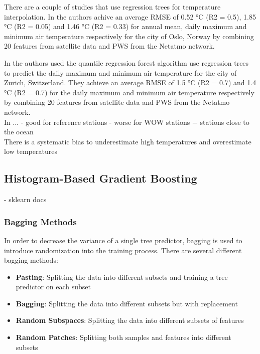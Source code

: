 There are a couple of studies that use regression trees for temperature interpolation. In \cite{venter2020hyperlocal} the authors achive an average RMSE of 0.52 °C (R2 = 0.5), 1.85 °C (R2 = 0.05) and 1.46 °C (R2 = 0.33) for annual mean, daily maximum and minimum air temperature respectively for the city of Oslo, Norway by combining 20 features from satellite data and PWS from the Netatmo network.

In \cite{zumwald2021mapping} the authors used the quantile regression forest algorithm
use regression trees to predict the daily maximum and minimum air temperature for the city of Zurich, Switzerland. They achieve an average RMSE of 1.5 °C (R2 = 0.7) and 1.4 °C (R2 = 0.7) for the daily maximum and minimum air temperature respectively by combining 20 features from satellite data and PWS from the Netatmo network.\\

In \cite{ho2014mapping}... %
- good for reference stations
- worse for WOW stations + stations close to the ocean\\

There is a systematic bias to underestimate high temperatures and overestimate low temperatures~\cite{zumwald2021mapping, zhang2012bias}

\subsection{Histogram-Based Gradient Boosting}



\cite{apaydin2022evaluation}
- sklearn docs

\subsubsection{Bagging Methods}

In order to decrease the variance of a single tree predictor, bagging is used to introduce randomization into the training process. There are several different bagging methods:

\begin{itemize}
    \item \textbf{Pasting}: Splitting the data into different subsets and training a tree predictor on each subset~\cite{breiman1999pasting}
    \item \textbf{Bagging}: Splitting the data into different subsets but with replacement~\cite{breiman1996bagging}
    \item \textbf{Random Subspaces}: Splitting the data into different subsets of features~\cite{ho1998random}
    \item \textbf{Random Patches}: Splitting both samples and features into different subsets~\cite{louppe2012ensembles}
\end{itemize}

